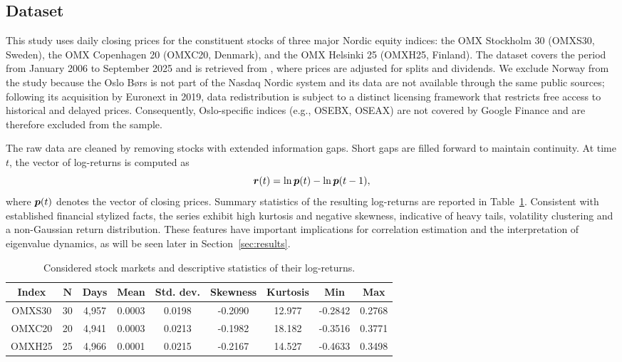 \documentclass[pdflatex,sn-basic]{sn-jnl}%
\theoremstyle{thmstyleone}%
\theoremstyle{thmstyletwo}%
\theoremstyle{thmstylethree}%
\begin{document}
\subsection{Dataset}
This study uses daily closing prices for the constituent stocks of three major
Nordic equity indices: the OMX Stockholm 30 (OMXS30, Sweden), the OMX Copenhagen
20 (OMXC20, Denmark), and the OMX Helsinki 25 (OMXH25, Finland).  The dataset
covers the period from January 2006 to September 2025 and is retrieved from
\citet{GoogleFinance2025}, where prices are adjusted for splits and dividends.  We
exclude Norway from the study because the Oslo B{\o}rs is not part of the Nasdaq Nordic system
and its data are not available through the same public sources; following its
acquisition by Euronext in 2019, data redistribution is subject to a distinct
licensing framework that restricts free access to historical and delayed
prices. Consequently, Oslo-specific indices (e.g., OSEBX, OSEAX) are not
covered by Google Finance and are therefore excluded from the sample.

The raw data are cleaned by removing stocks with extended information gaps. 
Short gaps are filled forward to maintain continuity. At time $t$, the vector of 
log-returns is computed as
\begin{equation}
\label{eqn:log_returns}
    \boldsymbol{r}(t)=\ln \boldsymbol{p}(t)-\ln \boldsymbol{p}(t-1),
\end{equation}
where $\boldsymbol{p}(t)$ denotes the vector of closing prices. Summary
statistics of the resulting log-returns are reported in Table~\ref{tab:summary_data}.  
Consistent with established financial stylized facts, the series exhibit high 
kurtosis and negative skewness, indicative of heavy tails, volatility clustering 
and a non-Gaussian return distribution. These features have important implications 
for correlation estimation and the interpretation of eigenvalue dynamics, as will be 
seen later in Section~\ref{sec:results}.

\begin{table}
    \centering
    \caption{Considered stock markets and descriptive statistics of their log-returns.}
    \label{tab:summary_data}
    \begin{tabular}{ccccccccc}
        \hline
    \textbf{Index}  & $\boldsymbol{N}$   & \textbf{Days} &    \textbf{Mean}     & \textbf{Std. dev.} &     \textbf{Skewness}  &  \textbf{Kurtosis}   &   \textbf{Min}    &     \textbf{Max}  \\
        \hline
    {OMXS30} & 30       & 4,957     &  0.0003  &  0.0198  &  -0.2090   &  12.977    &  -0.2842      &  0.2768 \\
    {OMXC20} & 20       & 4,941     &  0.0003  &  0.0213  &  -0.1982   &  18.182    &   -0.3516     &  0.3771 \\
    {OMXH25} & 25       & 4,966     &  0.0001  &  0.0215  &  -0.2167   &  14.527    &   -0.4633     &   0.3498 \\
        \hline
    \end{tabular}
\end{table}
\end{document}
